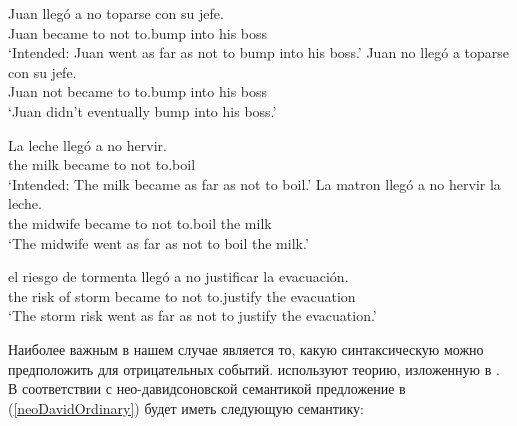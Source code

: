 \documentclass[a4paper, titlepage]{article}
\begin{document}
\begin{exe}
    \ex \begin{xlist}
        \ex \label{fabergasNotControlled} 
            \gll *Juan llegó a no toparse con su jefe. \\
                 Juan became to not to.bump into his boss \\
            \glt `Intended: Juan went as far as not to bump into his boss.'
        \ex
            \gll Juan no llegó a toparse con su jefe. \\
                 Juan not became to to.bump into his boss \\
            \glt `Juan didn’t eventually bump into his boss.'
    \end{xlist}
\end{exe}

\begin{exe}
    \ex \begin{xlist}
        \ex 
            \gll *La leche llegó a no hervir. \\
                 the milk became to not to.boil \\
            \glt `Intended: The milk became as far as not to boil.'
        \ex \label{fabergasAlternation} 
            \gll La matron llegó a no hervir la leche. \\
                 the midwife became to not to.boil the milk \\
            \glt `The midwife went as far as not to boil the milk.'
    \end{xlist}
\end{exe}

\begin{exe}
     \label{fabergasNonDirect} 
        \gll *el riesgo de tormenta llegó a no justificar la evacuación. \\
             the risk of storm became to not to.justify the evacuation \\
        \glt `The storm risk went as far as not to justify the evacuation.'
\end{exe}

Наиболее важным в нашем случае является то, какую синтаксическую можно предположить для отрицательных событий. \citep{fabergas2017building} используют теорию, изложенную в \citep{ramchand201Xauxiliaries}. В соответствии с нео-давидсоновской семантикой предложение в (\ref{neoDavidOrdinary}) будет иметь следующую семантику:
\end{document}
